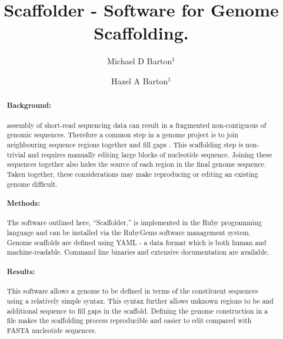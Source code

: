\documentclass[10pt]{bmc_article}
\newenvironment{bmcformat}{\begin{raggedright}\baselineskip20pt\sloppy\setboolean{publ}{false}}{\end{raggedright}\baselineskip20pt\sloppy}
\begin{document}
\begin{bmcformat}

\title{Scaffolder - Software for  Genome
Scaffolding.}

\author{
  Michael D Barton$^{1}$\correspondingauthor%
\and
  Hazel A Barton$^1$%
      }

\address{\iid(1) Department of Biological Sciences, Northern Kentucky %
University, Nunn Drive, Highland Heights, KY 41076 }%

\maketitle

\clearpage

\begin{abstract} %

  \paragraph*{Background:}  assembly of 
  short-read sequencing data can result in a fragmented non-contiguous
   of genomic sequences. Therefore a common step in
  a genome project is to join neighbouring sequence regions together and fill
  gaps . This scaffolding
  step is non-trivial and requires manually editing large
  blocks of nucleotide sequence. Joining these sequences together also hides
  the source of each region in the final genome sequence. Taken together,
  these considerations may make reproducing or editing an existing genome
   difficult.

  \paragraph*{Methods:} The software outlined here, ``Scaffolder,'' is
  implemented in the Ruby programming language and can be installed via the
  RubyGems software management system. Genome scaffolds are defined using YAML
  - a data format\remove{,} which is both human and machine-readable. Command
  line binaries and extensive documentation are available.

  \paragraph*{Results:} This software allows a genome 
  to be defined in terms of the constituent sequences using a relatively simple
  syntax. This syntax further allows unknown
  regions to be  and  additional
  sequence to  fill  gaps in the scaffold. Defining
  the genome construction in a file makes the scaffolding process reproducible
  and easier to edit compared with  FASTA nucleotide sequences.


\end{abstract}
\end{bmcformat}
\end{document}
